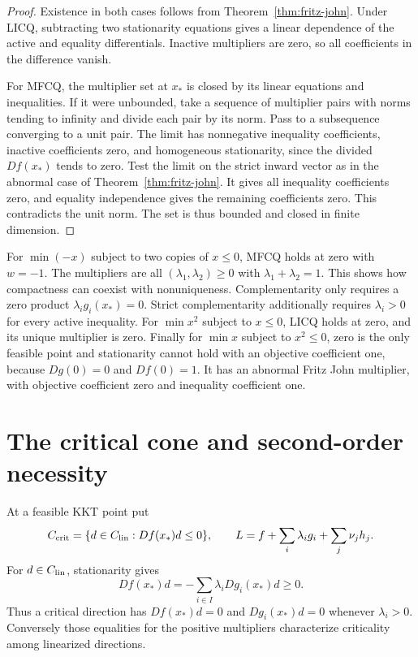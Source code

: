 \documentclass[11pt,oneside,openany]{book}
\theoremstyle{plain}
\theoremstyle{definition}
\theoremstyle{remark}
\begin{document}
\begin{proof}
Existence in both cases follows from
Theorem~\ref{thm:fritz-john}. Under LICQ,
subtracting two stationarity equations gives
a linear dependence of the active and equality
differentials. Inactive multipliers are zero,
so all coefficients in the difference vanish.

For MFCQ, the multiplier set at \(x_*\) is closed
by its linear equations and inequalities.
If it were unbounded, take a sequence of multiplier
pairs with norms tending to infinity and divide
each pair by its norm. Pass to a subsequence
converging to a unit pair. The limit has
nonnegative inequality coefficients, inactive
coefficients zero, and homogeneous stationarity,
since the divided \(Df(x_*)\) tends to zero.
Test the limit on the strict inward vector as
in the abnormal case of Theorem~\ref{thm:fritz-john}.
It gives all inequality coefficients zero,
and equality independence gives the remaining
coefficients zero. This contradicts the unit norm.
The set is thus bounded and closed in finite
dimension.
\end{proof}

For \(\min(-x)\) subject to two copies of
\(x\le0\), MFCQ holds at zero with \(w=-1\).
The multipliers are all \((\lambda_1,\lambda_2)
\ge0\) with \(\lambda_1+\lambda_2=1\).
This shows how compactness can coexist with
nonuniqueness. Complementarity only requires
a zero product \(\lambda_i g_i(x_*)=0\).
Strict complementarity additionally requires
\(\lambda_i>0\) for every active inequality.
For \(\min x^2\) subject to \(x\le0\), LICQ
holds at zero, and its unique multiplier is zero.
Finally for \(\min x\) subject to \(x^2\le0\),
zero is the only feasible point and stationarity
cannot hold with an objective coefficient one,
because \(Dg(0)=0\) and \(Df(0)=1\).
It has an abnormal Fritz John multiplier,
with objective coefficient zero and inequality
coefficient one.

\section{The critical cone and second-order necessity}
\label{v06-06}

At a feasible KKT point put
\[
 C_{\rm crit}=\{d\in C_{\rm lin}: Df(x_*)d\le0\},
 \qquad
 L=f+\sum_i\lambda_i g_i+\sum_j\nu_j h_j.
\]
For \(d\in C_{\rm lin}\), stationarity gives
\[
 Df(x_*)d=-\sum_{i\in I}\lambda_i Dg_i(x_*)d\ge0 .
\]
Thus a critical direction has \(Df(x_*)d=0\)
and \(Dg_i(x_*)d=0\) whenever \(\lambda_i>0\).
Conversely those equalities for the positive
multipliers characterize criticality among
linearized directions.
\end{document}
